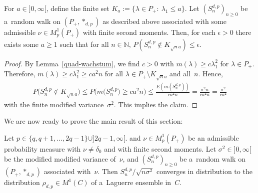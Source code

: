 \begin{Lemma}
\label{sn-wachstum}
For $a\in{}]0,\infty[$, define the finite set $K_a:=\{\lambda\in P_+:\> \lambda_1\le a\}$.
Let $(S_n^{d,p})_{n\ge0}$ be a~random walk on $(P_+,*_{d,p})$ as described above associated with some admissible $\nu\in
M^1_p(P_+)$ with finite second moments.
Then, for each $\epsilon>0$ there exists some $a\ge1$ such that for all $n\in\mathbb N$, $P(S_n^{d,p}\not\in K_{\sqrt
n  a})\le\epsilon$.
\end{Lemma}

\begin{proof}
By Lemma~\ref{quad-wachstum}, we f\/ind $c>0$ with $m(\lambda)\ge c\lambda_1^2$ for $\lambda\in P_+$.
Therefore, $m(\lambda)\ge c\lambda_1^2\ge ca^2n$ for all $\lambda\in P_+\setminus K_{\sqrt n  a}$ and all~$n$.
Hence,
\begin{gather*}
P\big(S_n^{d,p}\not\in K_{\sqrt n  a}\big)  \le  P\big(m\big(S_n^{d,p}\big)\ge ca^2n\big)   \le   \frac{E(m(S_n^{d,p}))}{ca^2n}
 = \frac{\sigma^2n}{ca^2n}=\frac{\sigma^2}{ca^2}
\end{gather*}
with the f\/inite modif\/ied variance~$\sigma^2$.
This implies the claim.
\end{proof}

We are now ready to prove the main result of this section:

\begin{Theorem}\label{clt}
Let $p\in \{q,q+1,\ldots,2q-1\}\cup]2q-1,\infty[$.
and $\nu\in M^1_p(P_+)$ be an admissible probability measure with $\nu\ne \delta_0$ and with finite second moments.
Let $\sigma^2\in{}]0,\infty[$ be the modified modified variance of~$\nu$, and $(S_n^{d,p})_{n\ge0}$ be a~random walk on
$(P_+,*_{d,p})$ associated with~$\nu$.
Then $ S_n^{d,p}/\sqrt{n\sigma^2}$ converges in distribution to the distribution $\rho_{d,p}\in M^1(C)$ of a~Laguerre
ensemble in~$C$.
\end{Theorem}


